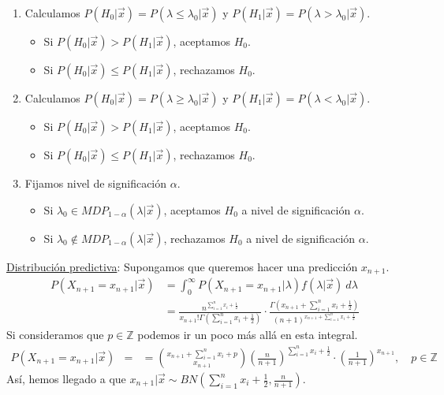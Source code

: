 \begin{enumerate}
    \item Calculamos $P(H_0 | \vec{x}) = P(\lambda \leq \lambda_0 |\vec{x})$ y $P(H_1 | \vec{x}) = P(\lambda > \lambda_0 | \vec{x})$.
    \begin{itemize}
        \item Si $P(H_0 | \vec{x}) > P(H_1 | \vec{x})$, aceptamos $H_0$.
        \item Si $P(H_0 | \vec{x}) \leq P(H_1 | \vec{x})$, rechazamos $H_0$.
    \end{itemize}
        \item Calculamos $P(H_0 | \vec{x}) = P(\lambda \ge \lambda_0 |\vec{x})$ y $P(H_1 | \vec{x}) = P(\lambda < \lambda_0 | \vec{x})$.
    \begin{itemize}
        \item Si $P(H_0 | \vec{x}) > P(H_1 | \vec{x})$, aceptamos $H_0$.
        \item Si $P(H_0 | \vec{x}) \leq P(H_1 | \vec{x})$, rechazamos $H_0$.
    \end{itemize}
    \item Fijamos nivel de significación $\alpha$.
    \begin{itemize}
        \item Si $\lambda_0 \in MDP_{1 - \alpha}(\lambda | \vec{x})$, aceptamos $H_0$ a nivel de significación $\alpha$.
        \item Si $\lambda_0 \not\in MDP_{1 - \alpha}(\lambda | \vec{x})$, rechazamos $H_0$ a nivel de significación $\alpha$.
    \end{itemize}
\end{enumerate}
\noindent \underline{Distribución predictiva}: Supongamos que queremos hacer una predicción $x_{n+1}$.
\begin{align*}
    P(X_{n+1} = x_{n+1} | \vec{x}) &= \int_{0}^{\infty} P(X_{n+1} = x_{n+1} | \lambda) f(\lambda | \vec{x}) \ d\lambda \\
    &= \frac{n^{\sum_{i=1}^{n} x_i + \frac{1}{2}}}{x_{n+1}!\Gamma(\sum_{i=1}^{n} x_i + \frac{1}{2})} \cdot \frac{\Gamma\left( x_{n+1} + \sum_{i=1}^{n} x_i + \frac{1}{2}\right)}{(n+1)^{x_{n+1} + \sum_{i=1}^{n} x_i + \frac{1}{2}}}
\end{align*}
Si consideramos que $p \in \mathbb{Z}$ podemos ir un poco más allá en esta integral.
\begin{align*}
    P(X_{n+1} = x_{n+1} | \vec{x}) &= 
    &= \binom{x_{n+1} + \sum_{i=1}^{n} x_i + p}{x_{n+1}}\left( \frac{n}{n+1}\right)^{\sum_{i=1}^{n} x_i + \frac{1}{2}} \cdot \left( \frac{1}{n+1}\right)^{x_{n+1}}, \quad p \in \mathbb{Z}
\end{align*}
Así, hemos llegado a que $x_{n+1} | \vec{x} \sim BN\left( \sum_{i=1}^{n} x_i + \frac{1}{2}, \frac{n}{n+1} \right)$.


